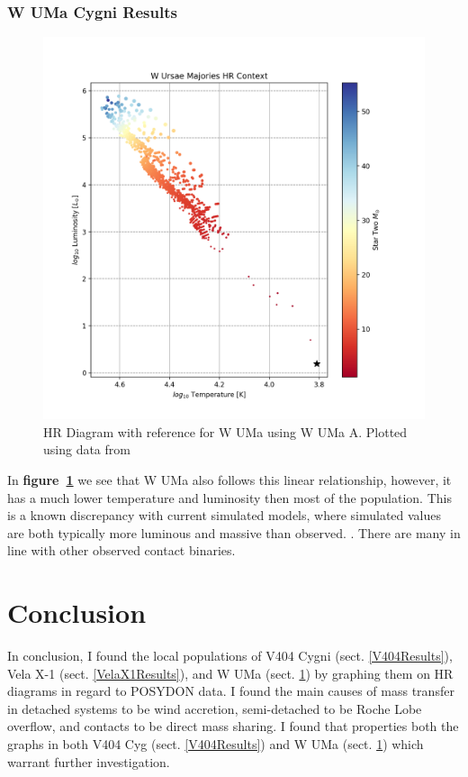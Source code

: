 \documentclass[12pt, a4paper]{article}
\begin{document}
        \subsubsection{W UMa Cygni Results}
            \begin{figure}[H]
                \centering
                \includegraphics[scale = .6]{figs/GeneratedFigs/W_UMa/WUMaHRDiagram.png}
                \caption{HR Diagram with reference for W UMa using W UMa A. Plotted using data from}
                \label{WUMaResults}
            \end{figure}

            In \textbf{figure~\ref{WUMaResults}} we see that W UMa also follows this linear relationship, however, it has a much lower temperature and luminosity then most of the population. This is a known discrepancy with current simulated models, where simulated values are both typically more luminous and massive than observed. \parencite{Fabry_2025}. There are many in line with other observed contact binaries.  




\section{\centering Conclusion}
    In conclusion, I found the local populations of V404 Cygni (sect. \ref{V404Results}), Vela X-1 (sect. \ref{VelaX1Results}), and W UMa (sect. \ref{WUMaResults}) by graphing them on HR diagrams in regard to POSYDON data. I found the main causes of mass transfer in detached systems to be wind accretion, semi-detached to be Roche Lobe overflow, and contacts to be direct mass sharing. I found that properties both the graphs in both V404 Cyg (sect. \ref{V404Results}) and W UMa (sect. \ref{WUMaResults}) which warrant further investigation.
\end{document}
